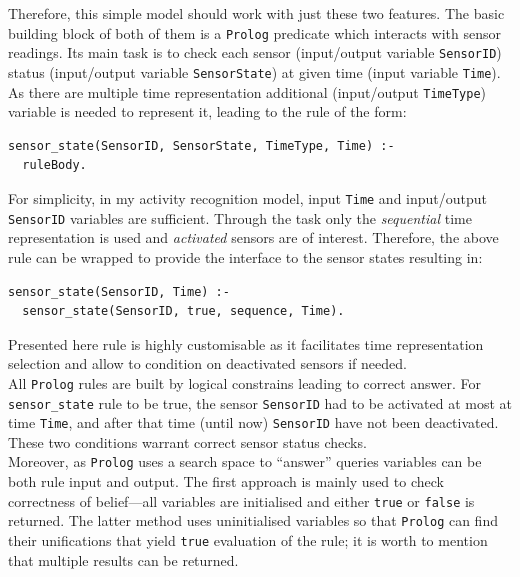 \documentclass[10pt, a4paper, pdflatex, leqno, twoside, openright]{report}
\begin{document}
Therefore, this simple model should work with just these two features. The basic building block of both of them is a \texttt{Prolog} predicate which interacts with sensor readings. Its main task is to check each sensor (input/output variable \texttt{SensorID}) status (input/output variable \texttt{SensorState}) at given time (input variable \texttt{Time}). As there are multiple time representation additional (input/output \texttt{TimeType}) variable is needed to represent it, leading to the rule of the form:\\
\begin{verbatim}
sensor_state(SensorID, SensorState, TimeType, Time) :-
  ruleBody.
\end{verbatim}
For simplicity, in my activity recognition model, input \texttt{Time} and input/output \texttt{SensorID} variables are sufficient. Through the task only the \emph{sequential} time representation is used and \emph{activated} sensors are of interest. Therefore, the above rule can be wrapped to provide the interface to the sensor states resulting in:\\
\begin{verbatim}
sensor_state(SensorID, Time) :-
  sensor_state(SensorID, true, sequence, Time).
\end{verbatim}
Presented here rule is highly customisable as it facilitates time representation selection and allow to condition on deactivated sensors if needed.\\
All \texttt{Prolog} rules are built by logical constrains leading to correct answer. For \texttt{sensor\_state} rule to be true, the sensor \texttt{SensorID} had to be activated at most at time \texttt{Time}, and after that time (until now) \texttt{SensorID} have not been deactivated. These two conditions warrant correct sensor status checks.\\
Moreover, as \texttt{Prolog} uses a search space to ``answer'' queries variables can be both rule input and output. The first approach is mainly used to check correctness of belief---all variables are initialised and either \texttt{true} or \texttt{false} is returned. The latter method uses uninitialised variables so that \texttt{Prolog} can find their unifications that yield \texttt{true} evaluation of the rule; it is worth to mention that multiple results can be returned.\\
\end{document}

